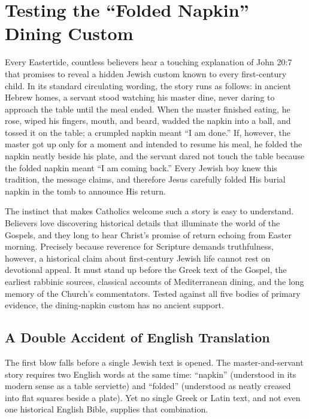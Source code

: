 \section{Testing the ``Folded Napkin'' Dining Custom}
\label{sec:folded-napkin}

Every Eastertide, countless believers hear a touching explanation of John 20:7 that promises to reveal a hidden Jewish custom known to every first-century child. In its standard circulating wording, the story runs as follows: in ancient Hebrew homes, a servant stood watching his master dine, never daring to approach the table until the meal ended. When the master finished eating, he rose, wiped his fingers, mouth, and beard, wadded the napkin into a ball, and tossed it on the table; a crumpled napkin meant ``I am done.'' If, however, the master got up only for a moment and intended to resume his meal, he folded the napkin neatly beside his plate, and the servant dared not touch the table because the folded napkin meant ``I am coming back.'' Every Jewish boy knew this tradition, the message claims, and therefore Jesus carefully folded His burial napkin in the tomb to announce His return.

The instinct that makes Catholics welcome such a story is easy to understand. Believers love discovering historical details that illuminate the world of the Gospels, and they long to hear Christ's promise of return echoing from Easter morning. Precisely because reverence for Scripture demands truthfulness, however, a historical claim about first-century Jewish life cannot rest on devotional appeal. It must stand up before the Greek text of the Gospel, the earliest rabbinic sources, classical accounts of Mediterranean dining, and the long memory of the Church's commentators. Tested against all five bodies of primary evidence, the dining-napkin custom has no ancient support.

\subsection{A Double Accident of English Translation}

The first blow falls before a single Jewish text is opened. The master-and-servant story requires two English words at the same time: ``napkin'' (understood in its modern sense as a table serviette) and ``folded'' (understood as neatly creased into flat squares beside a plate). Yet no single Greek or Latin text, and not even one historical English Bible, supplies that combination.

